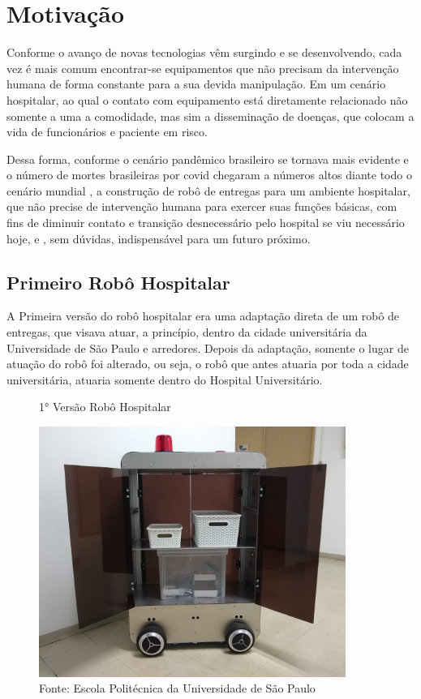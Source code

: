 \documentclass[../delivery_hospital_report.tex]{subfiles}
\begin{document}
\chapter{Motivação}

Conforme o avanço de novas tecnologias vêm surgindo e se desenvolvendo, cada vez é mais comum encontrar-se equipamentos que não precisam da intervenção humana de forma constante para  a sua devida manipulação. Em um cenário hospitalar, ao qual o contato com equipamento está diretamente relacionado não somente a uma a comodidade, mas sim a disseminação de doenças, que colocam a vida de funcionários e paciente em risco.

Dessa forma, conforme o cenário pandêmico brasileiro se tornava mais evidente \cite{covid2020} e o número de mortes brasileiras por covid chegaram a números altos diante todo o cenário mundial \cite{mortes_covid21}, a construção de robô de entregas para um ambiente hospitalar, que não precise de intervenção humana para exercer suas funções básicas, com fins de diminuir contato e transição desnecessário pelo hospital se viu necessário hoje, e , sem dúvidas, indispensável para um futuro próximo.

\section{Primeiro Robô Hospitalar}

A Primeira versão do robô hospitalar era uma adaptação direta de um robô de entregas, que visava atuar, a princípio, dentro da cidade universitária da Universidade de São Paulo e arredores. Depois da adaptação, somente o lugar de atuação do robô foi alterado, ou seja, o robô que antes atuaria por toda a cidade universitária, atuaria somente dentro do Hospital Universitário.

\begin{figure}[h]
\centering
    \caption{1° Versão Robô Hospitalar}
    \centering %
    \includegraphics[width=10cm]{v1_robo_hospitalar.jpeg}
    \caption*{Fonte: Escola Politécnica da Universidade de São Paulo}
    \label{figura:1° Versão Robô Hospitalar}
\end{figure}
\end{document}
